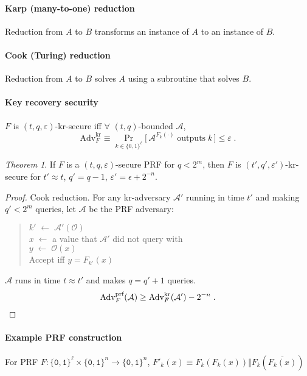 \documentclass[11pt]{article}
\newcommand{\eqdef}{\ensuremath{\equiv}}
\newcommand{\eps}{\ensuremath{\varepsilon}}
\newcommand{\bit}{\ensuremath{\{\texttt{0},\texttt{1}\}}}
\theoremstyle{remark}
\newtheorem{thm}{Theorem}
\begin{document}
\paragraph{Karp (many-to-one) reduction}
Reduction from $A$ to $B$ transforms
an instance of $A$ to an instance of $B$.

\paragraph{Cook (Turing) reduction}
Reduction from $A$ to $B$ solves $A$
using a subroutine that solves $B$.

\paragraph{Key recovery security}
$F$ is $(t,q,\eps)$-kr-secure
iff $\forall$ $(t,q)$-bounded $\mathcal{A}$,
\[ \textrm{Adv}_F^\textrm{kr} \eqdef
\Pr_{k \in \{0,1\}^\ell} \big[\,
  \mathcal{A}^{F_k(\cdot)}\;\textrm{outputs}\;k
\,\big] \le \eps \;\textrm{.} \]

\begin{thm}
If $F$ is a $(t,q,\eps)$-secure PRF
for $q < 2^m$, then
$F$ is $(t',q',\eps')$-kr-secure for
$t' \approx t$, $q' = q-1$, $\eps' = \epsilon + 2^{-n}$.
\begin{proof}
Cook reduction.
For any kr-adversary $\mathcal{A'}$ running in
time $t'$ and making $q'<2^m$ queries, let $\mathcal{A}$ be
the PRF adversary:
\begin{quote}
$k' \; \leftarrow \; \mathcal{A}'(\mathcal{O})$ \\
$x \; \leftarrow$ a value that $\mathcal{A}'$ did not query with \\
$y \; \leftarrow \; \mathcal{O}(x)$ \\
Accept iff $y = F_{k'}(x)$
\end{quote}
$\mathcal{A}$ runs in time $t \approx t'$ and makes $q = q'+1$ queries.
\[ \textrm{Adv}_F^\textrm{prf}(\mathcal{A}) \ge
\textrm{Adv}_F^\textrm{kr}(\mathcal{A}') - 2^{-n}
\;\textrm{.} \qedhere \]
\end{proof}
\end{thm}

\paragraph{Example PRF construction}
For PRF $F : \bit^\ell \times \bit^n \rightarrow \bit^n$,
$F'_k(x) \eqdef F_k(F_k(x)) \Vert F_k(\overline{F_k(x)})$
\end{document}
